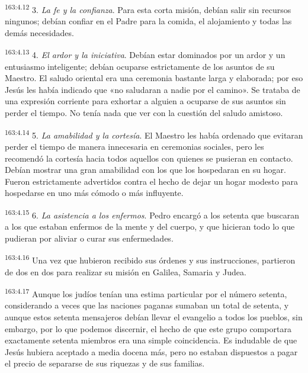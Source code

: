 \par 
\textsuperscript{163:4.12} 3. \textit{La fe y la confianza}. Para esta corta misión, debían salir sin recursos ningunos; debían confiar en el Padre para la comida, el alojamiento y todas las demás necesidades.

\par 
\textsuperscript{163:4.13} 4. \textit{El ardor y la iniciativa}. Debían estar dominados por un ardor y un entusiasmo inteligente; debían ocuparse estrictamente de los asuntos de su Maestro. El saludo oriental era una ceremonia bastante larga y elaborada; por eso Jesús les había indicado que «no saludaran a nadie por el camino». Se trataba de una expresión corriente para exhortar a alguien a ocuparse de sus asuntos sin perder el tiempo. No tenía nada que ver con la cuestión del saludo amistoso.

\par 
\textsuperscript{163:4.14} 5. \textit{La amabilidad y la cortesía}. El Maestro les había ordenado que evitaran perder el tiempo de manera innecesaria en ceremonias sociales, pero les recomendó la cortesía hacia todos aquellos con quienes se pusieran en contacto. Debían mostrar una gran amabilidad con los que los hospedaran en su hogar. Fueron estrictamente advertidos contra el hecho de dejar un hogar modesto para hospedarse en uno más cómodo o más influyente.

\par 
\textsuperscript{163:4.15} 6. \textit{La asistencia a los enfermos}. Pedro encargó a los setenta que buscaran a los que estaban enfermos de la mente y del cuerpo, y que hicieran todo lo que pudieran por aliviar o curar sus enfermedades.

\par 
\textsuperscript{163:4.16} Una vez que hubieron recibido sus órdenes y sus instrucciones, partieron de dos en dos para realizar su misión en Galilea, Samaria y Judea.

\par 
\textsuperscript{163:4.17} Aunque los judíos tenían una estima particular por el número setenta, considerando a veces que las naciones paganas sumaban un total de setenta, y aunque estos setenta mensajeros debían llevar el evangelio a todos los pueblos, sin embargo, por lo que podemos discernir, el hecho de que este grupo comportara exactamente setenta miembros era una simple coincidencia. Es indudable de que Jesús hubiera aceptado a media docena más, pero no estaban dispuestos a pagar el precio de separarse de sus riquezas y de sus familias.

